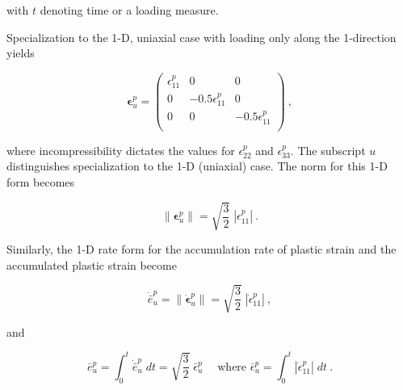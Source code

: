 \documentclass[11pt]{report}
\numberwithin{equation}{section}
\newcommand{\bmf } {\boldsymbol }
\begin{document}
\noindent with $t$ denoting time or a loading measure.

Specialization to the 1-D, uniaxial case with loading only along the 1-direction yields

\begin{equation}\label{E:epsplas_tensor_1D}
\bmf \epsilon^p_u =
 \begin{pmatrix}
     \epsilon^p_{11} & 0 & 0 \\
     0 & -0.5\epsilon^p_{11}  & 0 \\
     0 & 0 &  -0.5\epsilon^p_{11} \\
 \end{pmatrix}~,
\end{equation}

\noindent where incompressibility dictates the values for  $\epsilon^p_{22}$ and
$\epsilon^p_{33}$. The subscript $u$ distinguishes
specialization to the 1-D (uniaxial) case.  The norm for this 1-D form becomes

\begin{equation}
 \parallel \bmf \epsilon^p_u \parallel = 
\sqrt{\textstyle{\frac{3}{2}}} \; | \epsilon^p_{11}| ~.
\end{equation}

Similarly, the 1-D rate form for the accumulation rate of plastic strain and the
accumulated plastic strain become

\begin{equation}\label{E:dot_e_bar_p_u_define}
\dot{\bar e}^p_u = \parallel \dot{\bmf \epsilon}^p_u \parallel =
\sqrt{\textstyle{\frac{3}{2}}} \; | \dot \epsilon^p_{11}|~,
\end{equation}

\noindent and

\begin{equation}\label{E:e_bar_p_u_define}
\bar e^p_u = \int^t_0  \dot{\bar e}^p_u \; dt = 
\sqrt{\textstyle{\frac{3}{2}}} \; \bar \epsilon^p_u\; \quad \text{where   }
\bar \epsilon^p_u =\int^t_0  | \dot \epsilon^p_{11}| \; dt~.
\end{equation}




\end{document}
